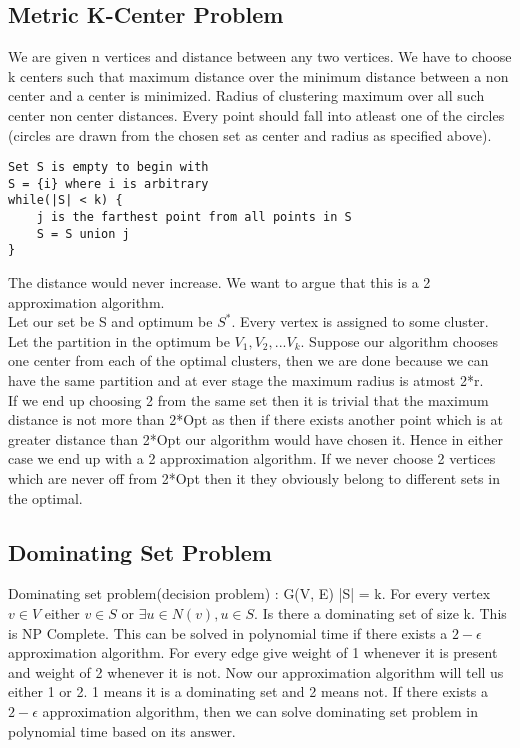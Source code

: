 \documentclass[solution,addpoints,12pt]{exam}
\begin{document}
\subsection{Metric K-Center Problem}
We are given n vertices and distance between any two vertices.
We have to choose k centers such that maximum distance over the
minimum distance between a non center and a center is minimized.
Radius of clustering maximum over all such center non center distances.
Every point should fall into atleast one of the circles (circles
are drawn from the chosen set as center and radius as specified above).\\
\begin{verbatim}
Set S is empty to begin with
S = {i} where i is arbitrary
while(|S| < k) {
    j is the farthest point from all points in S
    S = S union j
}
\end{verbatim}
The distance would never increase. We want to argue that this
is a 2 approximation algorithm.\\
Let our set be S and optimum be $S^*$. Every vertex is assigned to
some cluster. Let the partition in the optimum be $V_1, V_2, ... V_k$.
Suppose our algorithm chooses one center from each of the optimal
clusters, then we are done because we can have the same partition and
at ever stage the maximum radius is atmost 2*r.\\

If we end up choosing 2 from the same set then it is trivial
that the maximum distance is not more than 2*Opt as then
if there exists another point which is at greater distance than
2*Opt our algorithm would have chosen it. Hence in either
case we end up with a 2 approximation algorithm. If we never
choose 2 vertices which are never off from 2*Opt then
it they obviously belong to different sets in the
optimal.\\

\subsection{Dominating Set Problem}
Dominating set problem(decision problem) : G(V, E) |S| = k.
For every vertex $v \in V$ either $v \in S$ or $\exists u \in N(v), u \in S$.
Is there a dominating set of size k. This is NP Complete. This can be solved
in polynomial time if there exists a $2-\epsilon$ approximation algorithm.
For every edge give weight of 1 whenever it is present and weight of 2 whenever it is not.
Now our approximation algorithm will tell us either 1 or 2. 1 means it is
a dominating set and 2 means not.
If there exists a $2-\epsilon$ approximation algorithm, then we can solve dominating set problem
in polynomial time based on its answer.
\end{document}
